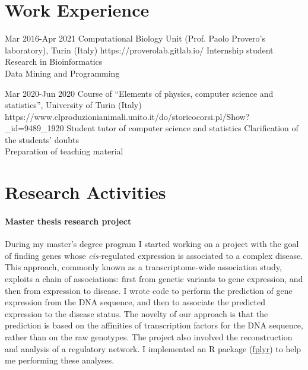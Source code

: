 \documentclass[10pt]{article} %
\begin{document}



\section{Work Experience}

\job
{Mar 2016-}{Apr 2021}
{Computational Biology Unit (Prof. Paolo Provero's laboratory), Turin (Italy)}
{https://proverolab.gitlab.io/}
{Internship student}
{
\bullet Research in Bioinformatics \\
\bullet Data Mining and Programming
}

\job
{Mar 2020-}{Jun 2020}
{Course of ``Elements of physics, computer science and statistics'', University of Turin (Italy)}
{https://www.clproduzionianimali.unito.it/do/storicocorsi.pl/Show?_id=9489_1920}
{Student tutor of computer science and statistics}
{
\bullet Clarification of the students' doubts \\
\bullet Preparation of teaching material
}

\section{Research Activities}

\paragraph{Master thesis research project}

During my master's degree program I started working on a project with the goal of finding genes whose \textit{cis-}regulated expression is associated to a complex disease. This approach, commonly known as a transcriptome-wide association study, exploits a chain of associations: first from genetic variants to gene expression, and then from expression to disease. I wrote code to perform the prediction of gene expression from the DNA sequence, and then to associate the predicted expression to the disease status. The novelty of our approach is that the prediction is based on the affinities of transcription factors for the DNA sequence, rather than on the raw genotypes. The project also involved the reconstruction and analysis of a regulatory network. I implemented an R package (\href{https://cran.r-project.org/web/packages/fplyr/index.html}{fplyr}) to help me performing these analyses.
\end{document}
